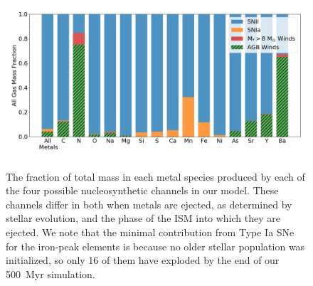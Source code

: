 \begin{figure}
\centering
\includegraphics[width=0.95\linewidth]{figures/ch3/species_bar_sources}\\
\caption{The fraction of total mass in each metal species produced by each of the four possible nucleosynthetic channels in our model. These channels differ in both when metals are ejected, as determined by stellar evolution, and the phase of the ISM into which they are ejected.
We note that the minimal contribution from Type Ia SNe for the iron-peak elements is because  no older stellar population was initialized, so only 16 of them have exploded by the end of our 500~Myr simulation.}

\label{fig:species_sources}
\end{figure}

